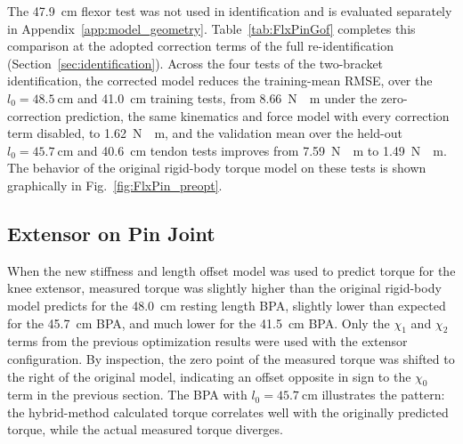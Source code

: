 The \qty{47.9}{\cm} flexor test was not used in identification and is evaluated separately in Appendix~\ref{app:model_geometry}. Table~\ref{tab:FlxPinGof} completes this comparison at the adopted correction terms of the full re-identification (Section~\ref{sec:identification}). Across the four tests of the two-bracket identification, the corrected model reduces the training-mean RMSE, over the $l_{0}=\qty{48.5}{\cm}$ and \qty{41.0}{\cm} training tests, from \qty{8.66}{\newton\cdot\meter} under the zero-correction prediction, the same kinematics and force model with every correction term disabled, to \qty{1.62}{\newton\cdot\meter}, and the validation mean over the held-out $l_{0}=\qty{45.7}{\cm}$ and \qty{40.6}{\cm} tendon tests improves from \qty{7.59}{\newton\cdot\meter} to \qty{1.49}{\newton\cdot\meter}. The behavior of the original rigid-body torque model on these tests is shown graphically in Fig.~\ref{fig:FlxPin_preopt}.



\subsection{Extensor on Pin Joint}

When the new stiffness and length offset model was used to predict torque for the knee extensor, measured torque was slightly higher than the original rigid-body model predicts for the \qty{48.0}{\cm} resting length BPA, slightly lower than expected for the \qty{45.7}{\cm} BPA, and much lower for the \qty{41.5}{\cm} BPA. Only the $\chi_{1}$ and $\chi_{2}$ terms from the previous optimization results were used with the extensor configuration. By inspection, the zero point of the measured torque was shifted to the right of the original model, indicating an offset opposite in sign to the $\chi_{0}$ term in the previous section. The BPA with $l_{0}=\qty{45.7}{\cm}$ illustrates the pattern: the hybrid-method calculated torque correlates well with the originally predicted torque, while the actual measured torque diverges. 

